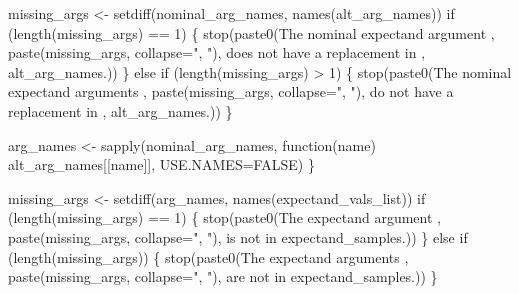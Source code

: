 \documentclass[
  letterpaper,
  DIV=11,
  numbers=noendperiod]{scrartcl}
\newenvironment{Shaded}{\begin{snugshade}}{\end{snugshade}}
\newcommand{\ControlFlowTok}[1]{\textcolor[rgb]{0.00,0.23,0.31}{#1}}
\newcommand{\DecValTok}[1]{\textcolor[rgb]{0.68,0.00,0.00}{#1}}
\newcommand{\NormalTok}[1]{\textcolor[rgb]{0.00,0.23,0.31}{#1}}
\newcommand{\OperatorTok}[1]{\textcolor[rgb]{0.37,0.37,0.37}{#1}}
\newcommand{\StringTok}[1]{\textcolor[rgb]{0.13,0.47,0.30}{#1}}
\begin{document}
\begin{Shaded}
\begin{Highlighting}[]
\NormalTok{    missing\_args }\OperatorTok{\textless{}{-}}\NormalTok{ setdiff(nominal\_arg\_names, names(alt\_arg\_names))}
    \ControlFlowTok{if}\NormalTok{ (length(missing\_args) }\OperatorTok{==} \DecValTok{1}\NormalTok{) \{}
\NormalTok{      stop(paste0(}\StringTok{\textquotesingle{}The nominal expectand argument \textquotesingle{}}\NormalTok{,}
\NormalTok{                  paste(missing\_args, collapse}\OperatorTok{=}\StringTok{", "}\NormalTok{),}
                  \StringTok{\textquotesingle{} does not have a replacement in \textquotesingle{}}\NormalTok{,}
                  \StringTok{\textquotesingle{}\textasciigrave{}alt\_arg\_names\textasciigrave{}.\textquotesingle{}}\NormalTok{))}
\NormalTok{    \} }\ControlFlowTok{else} \ControlFlowTok{if}\NormalTok{ (length(missing\_args) }\OperatorTok{\textgreater{}} \DecValTok{1}\NormalTok{) \{}
\NormalTok{      stop(paste0(}\StringTok{\textquotesingle{}The nominal expectand arguments \textquotesingle{}}\NormalTok{,}
\NormalTok{                  paste(missing\_args, collapse}\OperatorTok{=}\StringTok{", "}\NormalTok{),}
                  \StringTok{\textquotesingle{} do not have a replacement in \textquotesingle{}}\NormalTok{,}
                  \StringTok{\textquotesingle{}\textasciigrave{}alt\_arg\_names\textasciigrave{}.\textquotesingle{}}\NormalTok{))}
\NormalTok{    \}}

\NormalTok{    arg\_names }\OperatorTok{\textless{}{-}}\NormalTok{ sapply(nominal\_arg\_names,}
\NormalTok{                        function(name) alt\_arg\_names[[name]],}
\NormalTok{                        USE.NAMES}\OperatorTok{=}\NormalTok{FALSE)}
\NormalTok{  \}}

\NormalTok{  missing\_args }\OperatorTok{\textless{}{-}}\NormalTok{ setdiff(arg\_names, names(expectand\_vals\_list))}
  \ControlFlowTok{if}\NormalTok{ (length(missing\_args) }\OperatorTok{==} \DecValTok{1}\NormalTok{) \{}
\NormalTok{    stop(paste0(}\StringTok{\textquotesingle{}The expectand argument \textquotesingle{}}\NormalTok{,}
\NormalTok{                paste(missing\_args, collapse}\OperatorTok{=}\StringTok{", "}\NormalTok{),}
                \StringTok{\textquotesingle{} is not in \textasciigrave{}expectand\_samples\textasciigrave{}.\textquotesingle{}}\NormalTok{))}
\NormalTok{  \} }\ControlFlowTok{else} \ControlFlowTok{if}\NormalTok{ (length(missing\_args)) \{}
\NormalTok{    stop(paste0(}\StringTok{\textquotesingle{}The expectand arguments \textquotesingle{}}\NormalTok{,}
\NormalTok{                paste(missing\_args, collapse}\OperatorTok{=}\StringTok{", "}\NormalTok{),}
                \StringTok{\textquotesingle{} are not in \textasciigrave{}expectand\_samples\textasciigrave{}.\textquotesingle{}}\NormalTok{))}
\NormalTok{  \}}


\end{Highlighting}
\end{Shaded}
\end{document}

